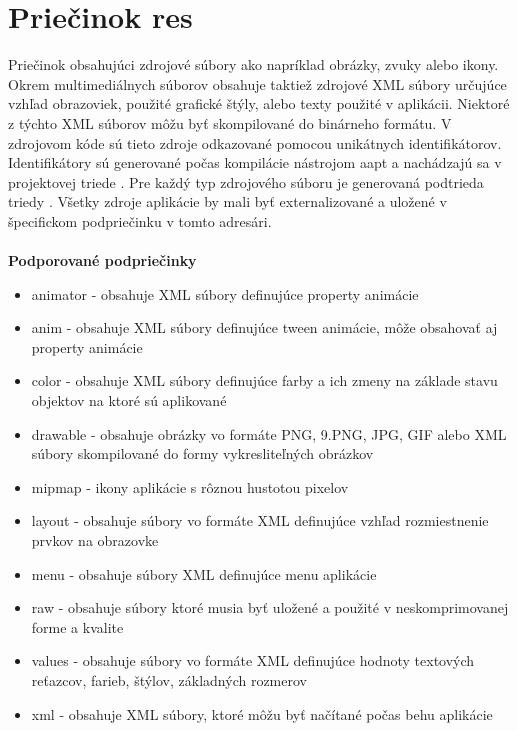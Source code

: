 \section{Priečinok res}
\label{res}
Priečinok obsahujúci zdrojové súbory ako napríklad obrázky, zvuky alebo ikony. Okrem multimediálnych súborov obsahuje taktiež zdrojové XML súbory určujúce vzhľad obrazoviek, použité grafické štýly, alebo texty použité v aplikácii. Niektoré z týchto XML súborov môžu byť skompilované do binárneho formátu. V zdrojovom kóde sú tieto zdroje odkazované pomocou unikátnych identifikátorov. Identifikátory sú generované počas kompilácie nástrojom aapt a nachádzajú sa v projektovej triede . Pre každý typ zdrojového súboru je generovaná podtrieda triedy . Všetky zdroje aplikácie by mali byť externalizované a uložené v špecifickom podpriečinku v tomto adresári. \\\\
\textbf{Podporované podpriečinky}
\begin{itemize}
\item animator - obsahuje XML súbory definujúce property animácie\cite{article-full}
\item anim - obsahuje XML súbory definujúce tween animácie, môže obsahovať aj property animácie
\item color - obsahuje XML súbory definujúce farby a ich zmeny na základe stavu objektov na ktoré sú aplikované
\item drawable - obsahuje obrázky vo formáte PNG, 9.PNG, JPG, GIF alebo XML súbory skompilované do formy vykresliteľných obrázkov
\item mipmap - ikony aplikácie s rôznou hustotou pixelov
\item layout - obsahuje súbory vo formáte XML definujúce vzhľad rozmiestnenie prvkov na obrazovke
\item menu - obsahuje súbory XML definujúce menu aplikácie
\item raw - obsahuje súbory ktoré musia byť uložené a použité v neskomprimovanej forme a kvalite
\item values - obsahuje súbory vo formáte XML definujúce hodnoty textových reťazcov, farieb, štýlov, základných rozmerov
\item xml - obsahuje XML súbory, ktoré môžu byť načítané počas behu aplikácie
\end{itemize}


